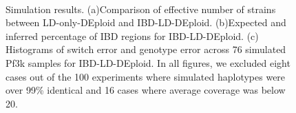 \documentclass[9pt,lineno]{elife}
\begin{document}
\begin{figure}[htp]
  \centering{}
  \\
  \caption{Simulation results. (a)Comparison of effective number of strains between LD-only-DEploid and IBD-LD-DEploid. (b)Expected and inferred percentage of IBD regions for IBD-LD-DEploid. (c) Histograms of switch error and genotype error across 76 simulated Pf3k samples for IBD-LD-DEploid. In all figures, we excluded eight cases out of the 100 experiments where simulated haplotypes were over 99\% identical and 16 cases where average coverage was below 20.
}\label{fig:benchmark}
\end{figure}
\end{document}
